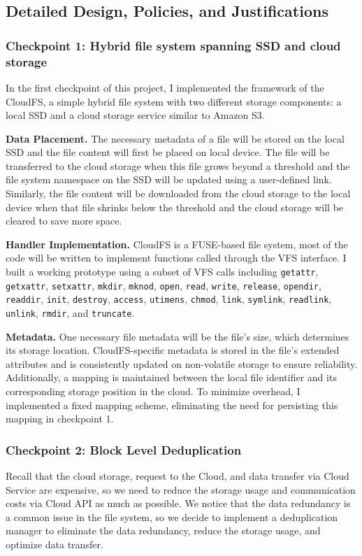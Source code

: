 \documentclass[10pt]{article}
\begin{document}
\subsection*{Detailed Design, Policies, and Justifications}  \vspace{0.6em}
\subsubsection*{Checkpoint 1: Hybrid file system spanning SSD and cloud storage}  \vspace{-0.6em}
In the first checkpoint of this project, I implemented the framework of the CloudFS, a simple hybrid file system with two different
storage components: a local SSD and a cloud storage service similar to Amazon S3.

\textbf{Data Placement.}
The necessary metadata of a file will be stored on the local SSD and the file content will first be placed on local device.
The file will be transferred to the cloud storage when this file grows beyond a threshold
and the file system namespace on the SSD will be updated using a user-defined link.
Similarly, the file content will be downloaded from the cloud storage to the local device when that file shrinks below the threshold and the cloud storage will be cleared to save more space.

\textbf{Handler Implementation.} CloudFS is a FUSE-based file system, most of the code will be written to implement functions
called through the VFS interface.
I built a working prototype using a subset of VFS calls including \texttt{getattr}, \texttt{getxattr},
\texttt{setxattr}, \texttt{mkdir}, \texttt{mknod}, \texttt{open}, \texttt{read}, \texttt{write}, \texttt{release}, \texttt{opendir}, \texttt{readdir}, \texttt{init}, \texttt{destroy},
\texttt{access}, \texttt{utimens}, \texttt{chmod}, \texttt{link}, \texttt{symlink}, \texttt{readlink}, \texttt{unlink}, \texttt{rmdir}, and \texttt{truncate}.

\textbf{Metadata.} One necessary file metadata will be the file's size, which determines its storage location.
CloudFS-specific metadata is stored in the file's extended attributes and is consistently updated on non-volatile storage to ensure reliability. Additionally, a mapping is maintained between the local file identifier and its corresponding storage position in the cloud. To minimize overhead, I implemented a fixed mapping scheme, eliminating the need for persisting this mapping in checkpoint 1.


\subsubsection*{Checkpoint 2: Block Level Deduplication} \vspace{-0.6em}
Recall that the cloud storage, request to the Cloud, and data transfer via Cloud Service are expensive, so we need to reduce the storage usage and communication costs via Cloud API as much as possible. We notice that the data redundancy is a common issue in the file system, so we decide to implement a deduplication manager to eliminate the data redundancy, reduce the storage usage, and optimize data transfer.
\end{document}
